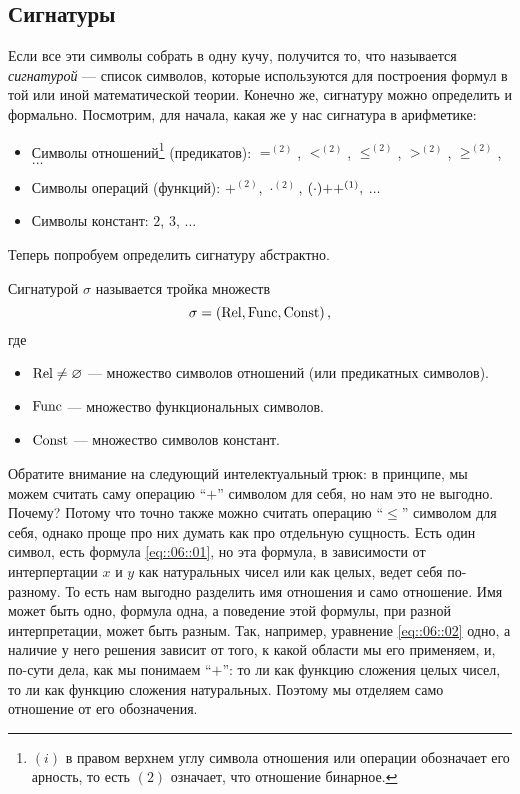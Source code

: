 \subsection{Сигнатуры}

Если все эти символы собрать в одну кучу, получится то, что называется {\it сигнатурой} --- список символов, которые используются для построения формул в той или иной математической теории.
Конечно же, сигнатуру можно определить и формально.
Посмотрим, для начала, какая же у нас сигнатура в арифметике:
\begin{itemize}
    \item Символы отношений\footnote{$(i)$ в правом верхнем углу символа отношения или операции обозначает его арность, то есть $(2)$ означает, что отношение бинарное.} (предикатов): $=^{(2)}$, $<^{(2)}$, $\leqslant^{(2)}$, $>^{(2)}$, $\geqslant^{(2)}$, $\ldots$
    \item Символы операций (функций): $+^{(2)}$, $\cdot^{(2)}$, $(\cdot){++}^{(1)},$ $\ldots$
    \item Символы констант: $2$, $3$, $\ldots$
\end{itemize}
Теперь попробуем определить сигнатуру абстрактно.
\begin{definition}
    Сигнатурой $\sigma$ называется тройка множеств
    $$
        \sigma = \left(\mathrm{Rel}, \mathrm{Func}, \mathrm{Const}\right),
    $$
    где
    \begin{itemize}
        \item $\mathrm{Rel} \neq \varnothing$ --- множество символов отношений (или предикатных символов).
        \item $\mathrm{Func}$ --- множество функциональных символов.
        \item $\mathrm{Const}$ --- множество символов констант.
    \end{itemize}
\end{definition}
Обратите внимание на следующий интелектуальный трюк: в принципе, мы можем считать саму операцию \enquote{$+$} символом для себя, но нам это не выгодно.
Почему?
Потому что точно также можно считать операцию \enquote{$\leqslant$} символом для себя, однако проще про них думать как про отдельную сущность.
Есть один символ, есть формула \eqref{eq::06::01}, но эта формула, в зависимости от интерпертации $x$ и $y$ как натуральных чисел или как целых, ведет себя по-разному.
То есть нам выгодно разделить имя отношения и само отношение.
Имя может быть одно, формула одна, а поведение этой формулы, при разной интерпретации, может быть разным.
Так, например, уравнение \eqref{eq::06::02} одно, а наличие у него решения зависит от того, к какой области мы его применяем, и, по-сути дела, как мы понимаем \enquote{$+$}: то ли как функцию сложения целых чисел, то ли как функцию сложения натуральных.
Поэтому мы отделяем само отношение от его обозначения.

